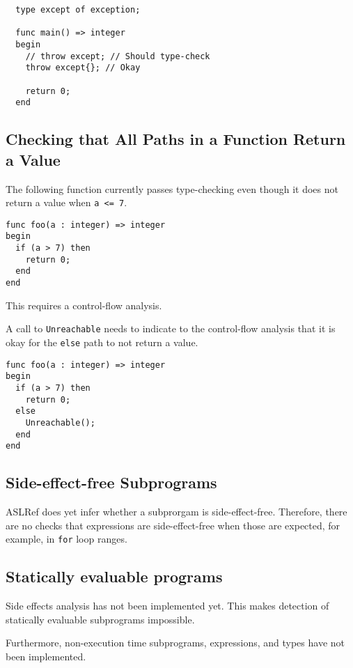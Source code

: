 \begin{verbatim}
  type except of exception;

  func main() => integer
  begin
    // throw except; // Should type-check
    throw except{}; // Okay

    return 0;
  end
\end{verbatim}

\subsection{Checking that All Paths in a Function Return a Value}
The following function currently passes type-checking even though
it does not return a value when \texttt{a <= 7}.
\begin{verbatim}
func foo(a : integer) => integer
begin
  if (a > 7) then
    return 0;
  end
end
\end{verbatim}
This requires a control-flow analysis.

A call to \texttt{Unreachable} needs to indicate to the control-flow
analysis that it is okay for the \texttt{else} path to not return a value.
\begin{verbatim}
func foo(a : integer) => integer
begin
  if (a > 7) then
    return 0;
  else
    Unreachable();
  end
end
\end{verbatim}

\subsection{Side-effect-free Subprograms}
ASLRef does yet infer whether a subprorgam is side-effect-free.
Therefore, there are no checks that expressions are side-effect-free when those are expected,
for example, in \texttt{for} loop ranges.


\subsection{Statically evaluable programs}%
\label{sec:nyi:statically-evaluable-subprograms}

Side effects analysis has not been implemented yet.
%
This makes detection of statically evaluable subprograms impossible.

Furthermore, non-execution time subprograms, expressions, and types have not
been implemented.


